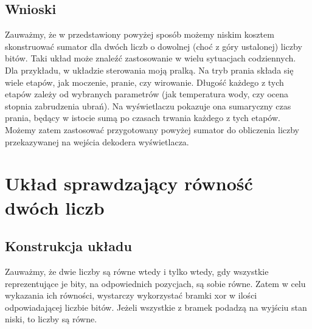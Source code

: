 \documentclass{article}
\begin{document}
            
        \subsection{Wnioski}
            Zauważmy, że w przedstawiony powyżej sposób możemy niskim kosztem skonstruować sumator dla dwóch liczb o dowolnej (choć z góry ustalonej) liczby bitów. Taki układ może znaleźć zastosowanie w wielu sytuacjach codziennych. Dla przykładu, w układzie sterowania moją pralką. Na tryb prania składa się wiele etapów, jak moczenie, pranie, czy wirowanie. Długość każdego z tych etapów zależy od wybranych parametrów (jak temperatura wody, czy ocena stopnia zabrudzenia ubrań). Na wyświetlaczu pokazuje ona sumaryczny czas prania, będący w istocie sumą po czasach trwania każdego z tych etapów. Możemy zatem zastosować przygotowany powyżej sumator do obliczenia liczby przekazywanej na wejścia dekodera wyświetlacza. 
            
            
    \section{Układ sprawdzający równość dwóch liczb}
        \subsection{Konstrukcja układu}
            Zauważmy, że dwie liczby są równe wtedy i tylko wtedy, gdy wszystkie reprezentujące je bity, na odpowiednich pozycjach, są sobie równe. Zatem w celu wykazania ich równości, wystarczy wykorzystać bramki xor w ilości odpowiadającej liczbie bitów. Jeżeli wszystkie z bramek podadzą na wyjściu stan niski, to liczby są równe.
\end{document}
